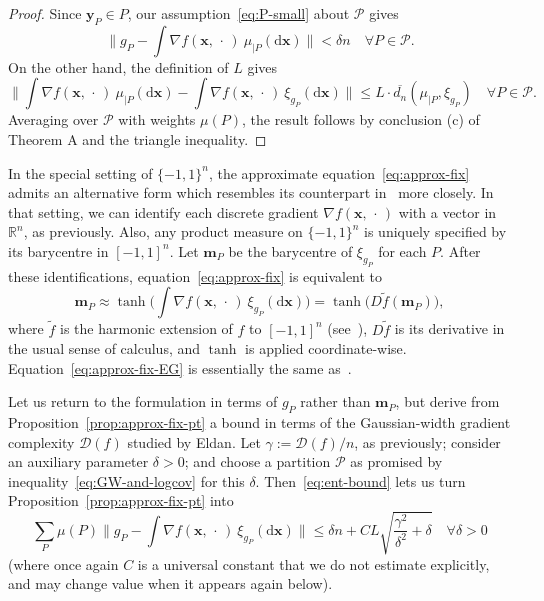 \documentclass[aop,preprint]{imsart}
\theoremstyle{remark}
\renewcommand{\bf}[1]{\boldsymbol{#1}}
\renewcommand{\cal}[1]{\mathcal{#1}}
\newcommand{\bbR}{\mathbb{R}}
\renewcommand{\d}{\mathrm{d}}
\renewcommand{\P}{\mathcal{P}}
\newcommand{\g}{\gamma}
\newcommand{\ol}[1]{\overline{#1}}
\begin{document}
\begin{proof}
Since $\bf{y}_P \in P$, our assumption~\eqref{eq:P-small} about $\P$ gives
\[\Big\|g_P - \int \nabla f(\bf{x},\,\cdot\,)\ \mu_{|P}(\d\bf{x})\Big\| < \delta n \quad \forall P \in \cal{P}.\]
On the other hand, the definition of $L$ gives
\[	\Big\|\int \nabla f(\bf{x},\,\cdot\,)\ \mu_{|P}(\d\bf{x}) - \int \nabla f(\bf{x},\,\cdot\,)\ \xi_{g_P}(\d\bf{x})\Big\|
	\leq L\cdot \ol{d_n}(\mu_{|P},\xi_{g_P}) \quad \forall P \in \cal{P}.\]
	Averaging over $\P$ with weights $\mu(P)$, the result follows by conclusion (c) of Theorem A and the triangle inequality.
	\end{proof}

In the special setting of $\{-1,1\}^n$, the approximate equation~\eqref{eq:approx-fix} admits an alternative form which resembles its counterpart in~\cite{EldGro18} more closely.  In that setting, we can identify each discrete gradient $\nabla f(\bf{x},\,\cdot\,)$ with a vector in $\bbR^n$, as previously.  Also, any product measure on $\{-1,1\}^n$ is uniquely specified by its barycentre in $[-1,1]^n$.  Let $\bf{m}_P$ be the barycentre of $\xi_{g_P}$ for each $P$. After these identifications, equation~\eqref{eq:approx-fix} is equivalent to
\begin{equation}\label{eq:approx-fix-EG}
\bf{m}_P \approx \tanh\Big(\int \nabla f(\bf{x},\,\cdot\,)\ \xi_{g_P}(\d \bf{x})\Big) = \tanh\big(D\widetilde{f}(\bf{m}_P)\big),
\end{equation}
where $\widetilde{f}$ is the harmonic extension of $f$ to $[-1,1]^n$ (see~\cite[Subsubsection 3.1.1]{Eld--GWcomp}), $D\widetilde{f}$ is its derivative in the usual sense of calculus, and $\tanh$ is applied coordinate-wise.  Equation~\eqref{eq:approx-fix-EG} is essentially the same as~\cite[equation (8)]{EldGro18}.

Let us return to the formulation in terms of $g_P$ rather than $\bf{m}_P$, but derive from Proposition~\ref{prop:approx-fix-pt} a bound in terms of the Gaussian-width gradient complexity $\cal{D}(f)$ studied by Eldan.  Let $\g:= \cal{D}(f)/n$, as previously; consider an auxiliary parameter $\delta > 0$; and choose a partition $\P$ as promised by inequality~\eqref{eq:GW-and-logcov} for this $\delta$.  Then~\eqref{eq:ent-bound} lets us turn Proposition~\ref{prop:approx-fix-pt} into
	\[\sum_{P}\mu(P)\Big\|g_P - \int \nabla f(\bf{x},\,\cdot\,)\ \xi_{g_P}(\d\bf{x})\Big\| \leq \delta n + CL\sqrt{\frac{\g^2}{\delta^2} + \delta} \quad \forall \delta > 0\]
(where once again $C$ is a universal constant that we do not estimate explicitly, and may change value when it appears again below).
\end{document}
